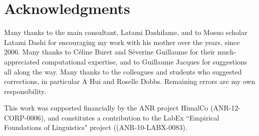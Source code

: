 \documentclass[oldfontcommands,oneside,a4paper,11pt]{article}
\begin{document}
	
	\section{Acknowledgments} \label{sec:ackno}
	
	Many thanks to the main consultant, Latami Dashilame, and to Mosuo scholar Latami Dashi for encouraging my work with his mother over the years, since 2006. Many thanks to Céline Buret and Séverine Guillaume for their much-appreciated computational expertise, and to Guillaume Jacques for suggestions all along the way. Many thanks to the colleagues and students who suggested corrections, in particular A Hui and Roselle Dobbs. Remaining errors are my own responsibility. 
	
	This work was supported financially by the ANR project HimalCo (ANR-12-CORP-0006), and constitutes a contribution to the LabEx “Empirical Foundations of Linguistics" project ((ANR-10-LABX-0083).
	
\end{document}
